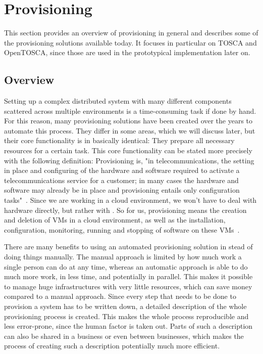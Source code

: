 \section{Provisioning}
\label{fundamentals:provisioning}

This section provides an overview of provisioning in general and describes some of the provisioning solutions available today.
It focuses in particular on TOSCA and OpenTOSCA, since those are used in the prototypical implementation later on.

\subsection{Overview}

Setting up a complex distributed system with many different components scattered across multiple environments is a time-consuming task if done by hand.
For this reason, many provisioning solutions have been created over the years to automate this process.
They differ in some areas, which we will discuss later, but their core functionality is in basically identical: They prepare all necessary resources for a certain task.
This core functionality can be stated more precisely with the following definition: Provisioning is, "in telecommunications, the setting in place and configuring of the hardware and software required to activate a telecommunications service for a customer; in many cases the hardware and software may already be in place and provisioning entails only configuration tasks"~\autocite{def:provisioning}.
Since we are working in a cloud environment, we won't have to deal with hardware directly, but rather with .
So for us, provisioning means the creation and deletion of VMs in a cloud environment, as well as the installation, configuration, monitoring, running and stopping of software on these VMs~\autocite{provisioning:architecture}.

There are many benefits to using an automated provisioning solution in stead of doing things manually.
The manual approach is limited by how much work a single person can do at any time, whereas an automatic approach is able to do much more work, in less time, and potentially in parallel.
This makes it possible to manage huge infrastructures with very little resources, which can save money compared to a manual approach.
Since every step that needs to be done to provision a system has to be written down, a detailed description of the whole provisioning process is created.
This makes the whole process reproducible and less error-prone, since the human factor is taken out.
Parts of such a description can also be shared in a business or even between businesses, which makes the process of creating such a description potentially much more efficient.

